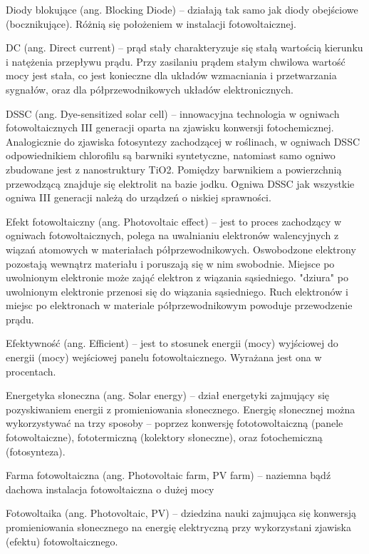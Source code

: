 \documentclass[12pt,a4paper]{article}
\begin{document}
Diody blokujące (ang. Blocking Diode) – działają tak samo jak diody obejściowe (bocznikujące). Różnią się położeniem w instalacji fotowoltaicznej.

DC (ang. Direct current) – prąd stały charakteryzuje się stałą wartością kierunku i natężenia przepływu prądu. Przy zasilaniu prądem stałym chwilowa wartość mocy jest stała, co jest konieczne dla układów wzmacniania i przetwarzania sygnałów, oraz dla półprzewodnikowych układów elektronicznych.

DSSC (ang. Dye-sensitized solar cell) – innowacyjna technologia w ogniwach fotowoltaicznych III generacji oparta na zjawisku konwersji fotochemicznej. Analogicznie do zjawiska fotosyntezy zachodzącej w roślinach, w ogniwach DSSC odpowiednikiem chlorofilu są barwniki syntetyczne, natomiast samo ogniwo zbudowane jest z nanostruktury TiO2. Pomiędzy barwnikiem a powierzchnią przewodzącą znajduje się elektrolit na bazie jodku. Ogniwa DSSC jak wszystkie ogniwa III generacji należą do urządzeń o niskiej sprawności.

Efekt fotowoltaiczny (ang. Photovoltaic effect) – jest to proces zachodzący w ogniwach fotowoltaicznych, polega na uwalnianiu elektronów walencyjnych z wiązań atomowych w materiałach półprzewodnikowych. Oswobodzone elektrony pozostają wewnątrz materiału i poruszają się w nim swobodnie. Miejsce po uwolnionym elektronie może zająć elektron z wiązania sąsiedniego. "dziura" po uwolnionym elektronie przenosi się do wiązania sąsiedniego. Ruch elektronów i miejsc po elektronach w materiale półprzewodnikowym powoduje przewodzenie prądu.

Efektywność (ang. Efficient) – jest to stosunek energii (mocy) wyjściowej do energii (mocy) wejściowej panelu fotowoltaicznego. Wyrażana jest ona w procentach.

Energetyka słoneczna (ang. Solar energy) – dział energetyki zajmujący się pozyskiwaniem energii z promieniowania słonecznego. Energię słonecznej można wykorzystywać na trzy sposoby – poprzez konwersję fototowoltaiczną (panele fotowoltaiczne), fototermiczną (kolektory słoneczne), oraz fotochemiczną (fotosynteza).

Farma fotowoltaiczna (ang. Photovoltaic farm, PV farm) – naziemna bądź dachowa instalacja fotowoltaiczna o dużej mocy

Fotowoltaika (ang. Photovoltaic, PV) – dziedzina nauki zajmująca się konwersją promieniowania słonecznego na energię elektryczną przy wykorzystani zjawiska (efektu) fotowoltaicznego.
\end{document}
